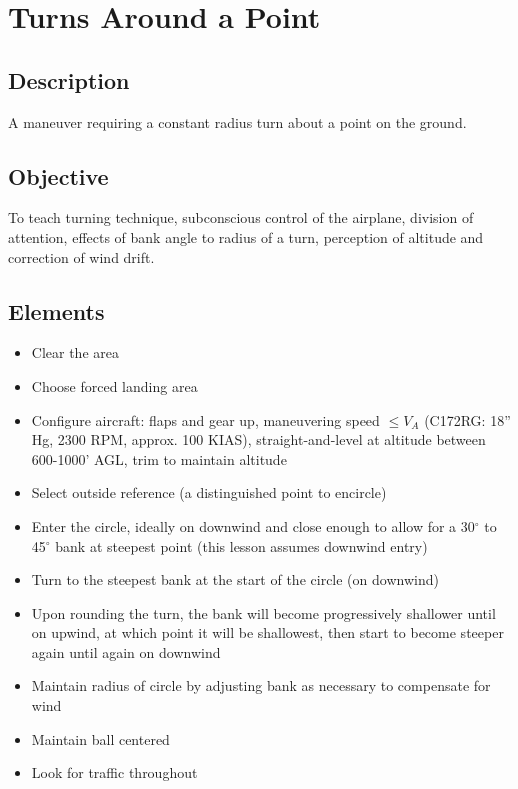\section{Turns Around a Point}

\subsection{Description}

A maneuver requiring a constant radius turn about a point on the ground.

\subsection{Objective}

To teach turning technique, subconscious control of the airplane, division of
attention, effects of bank angle to radius of a turn, perception of altitude
and correction of wind drift.

\subsection{Elements}

\begin{itemize}
  \item Clear the area
  \item Choose forced landing area
  \item Configure aircraft: flaps and gear up, maneuvering speed $\leq V_A$
    (C172RG: 18'' Hg, 2300 RPM, approx. 100 KIAS), straight-and-level at
    altitude between 600-1000' AGL, trim to maintain altitude
  \item Select outside reference (a distinguished point to encircle)
  \item Enter the circle, ideally on downwind and close enough to allow for a
    30$^\circ$ to 45$^\circ$ bank at steepest point (this lesson assumes
    downwind entry)
  \item Turn to the steepest bank at the start of the circle (on downwind)
  \item Upon rounding the turn, the bank will become progressively shallower
    until on upwind, at which point it will be shallowest, then start to become
    steeper again until again on downwind
  \item Maintain radius of circle by adjusting bank as necessary to compensate
    for wind
  \item Maintain ball centered
  \item Look for traffic throughout
\end{itemize}

